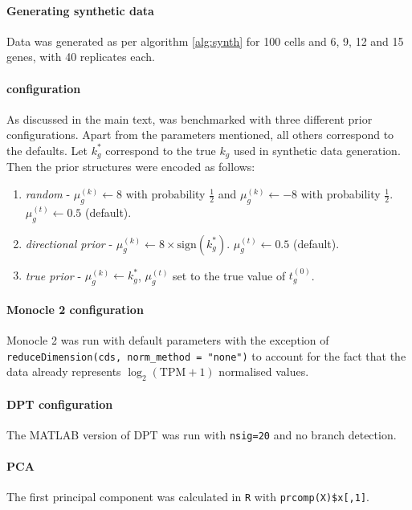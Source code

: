 \paragraph{Generating synthetic data}

Data was generated as per algorithm \ref{alg:synth} for 100 cells and 6, 9, 12 and 15 genes, with 40 replicates each.

\paragraph{\sname configuration}

As discussed in the main text, \sname was benchmarked with three different prior configurations. Apart from the parameters mentioned, all others correspond to the \sname defaults. Let $k_g^*$ correspond to the true $k_g$ used in synthetic data generation. Then the prior structures were encoded as follows:

\begin{enumerate}
\item \emph{random} - $\mu^{(k)}_g \gets 8$ with probability $\frac{1}{2}$ and $\mu^{(k)}_g \gets -8$ with probability $\frac{1}{2}$. $\mu^{(t)}_g \gets 0.5$ (default).
\item \emph{directional prior} - $\mu^{(k)}_g \gets 8 \times \text{sign}(k_g^*) $.  $\mu^{(t)}_g \gets 0.5$ (default).
\item \emph{true prior} - $\mu^{(k)}_g \gets k_g^*$, $\mu^{(t)}_g$ set to the true value of $t_g^{(0)}$.
\end{enumerate}


\paragraph{Monocle 2 configuration}

Monocle 2 was run with default parameters with the exception of \texttt{reduceDimension(cds, norm\_method = "none")} to account for the fact that the data already represents $\log_2(\text{TPM} + 1)$ normalised values.

\paragraph{DPT configuration} The MATLAB version of DPT was run with \texttt{nsig=20} and no branch detection.

\paragraph{PCA} The first principal component was calculated in \texttt{R} with \texttt{prcomp(X)\$x[,1]}.


